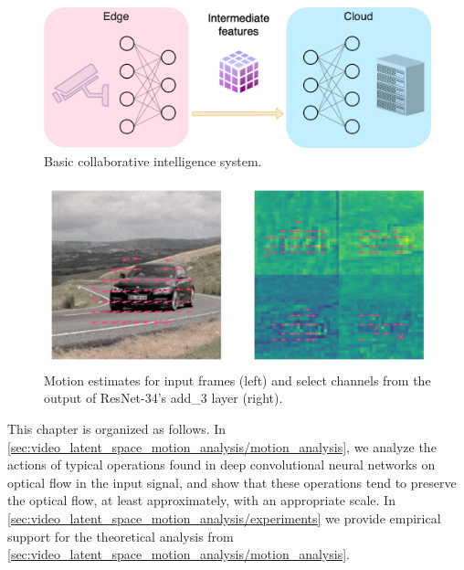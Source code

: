 \begin{figure}[htbp]
    \centering
    \vspace{\baselineskip}%
    \includegraphics[width=\columnwidth]{img/video_latent_space_motion_analysis/CI_system.png}%
    \vspace{0.5\baselineskip}%
    \caption[Basic collaborative intelligence system]{%
      Basic collaborative intelligence system.%
    }
    \label{fig:video_latent_space_motion_analysis/CI_system}
\end{figure}

\begin{figure}[htbp]
    \centering
    \includegraphics[width=\columnwidth]{img/video_latent_space_motion_analysis/mv_car.png}
    \caption[Motion estimates for input frames and feature maps]{%
        Motion estimates for input frames (left) and
        select channels from the output of ResNet-34's add\_3 layer (right).
    }
    \label{fig:video_latent_space_motion_analysis/mv_overview}
\end{figure}

This chapter is organized as follows. In \cref{sec:video_latent_space_motion_analysis/motion_analysis}, we analyze the actions of typical operations found in deep convolutional neural networks on optical flow in the input signal, and show that these operations tend to preserve the optical flow, at least approximately, with an appropriate scale. In \cref{sec:video_latent_space_motion_analysis/experiments} we provide empirical support for the theoretical analysis from \cref{sec:video_latent_space_motion_analysis/motion_analysis}. %


